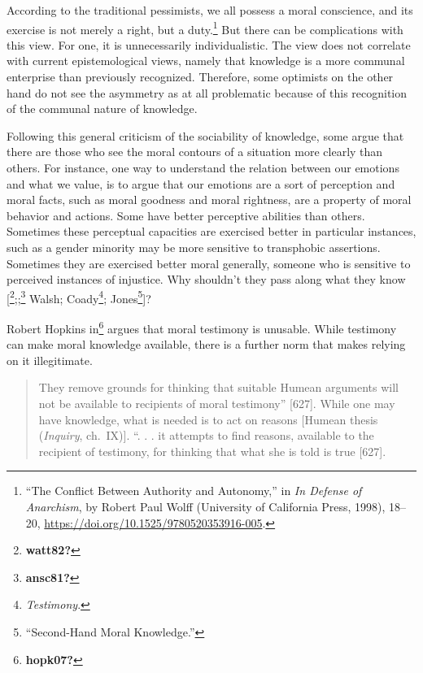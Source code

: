 \documentclass[
  12pt,
]{book}
\theoremstyle{definition}
\theoremstyle{definition}
\theoremstyle{definition}
\theoremstyle{definition}
\theoremstyle{remark}
\begin{document}
According to the traditional pessimists, we all possess a moral conscience, and its exercise is not merely a right, but a duty.\footnote{{``The {Conflict Between Authority} and {Autonomy},''} in \emph{In {Defense} of {Anarchism}}, by Robert Paul Wolff (University of California Press, 1998), 18--20, \url{https://doi.org/10.1525/9780520353916-005}.} But there can be complications with this view. For one, it is unnecessarily individualistic. The view does not correlate with current epistemological views, namely that knowledge is a more communal enterprise than previously recognized. Therefore, some optimists on the other hand do not see the asymmetry as at all problematic because of this recognition of the communal nature of knowledge.

Following this general criticism of the sociability of knowledge, some argue that there are those who see the moral contours of a situation more clearly than others. For instance, one way to understand the relation between our emotions and what we value, is to argue that our emotions are a sort of perception and moral facts, such as moral goodness and moral rightness, are a property of moral behavior and actions. Some have better perceptive abilities than others. Sometimes these perceptual capacities are exercised better in particular instances, such as a gender minority may be more sensitive to transphobic assertions. Sometimes they are exercised better moral generally, someone who is sensitive to perceived instances of injustice. Why shouldn't they pass along what they know {[}\footnote{\textbf{watt82?}};;\footnote{\textbf{ansc81?}} Walsh; Coady\footnote{\emph{Testimony}.}; Jones\footnote{{``Second-{Hand Moral Knowledge}.''}}{]}?

Robert Hopkins in\footnote{\textbf{hopk07?}} argues that moral testimony is unusable. While testimony can make moral knowledge available, there is a further norm that makes relying on it illegitimate.

\begin{quote}
They remove grounds for thinking that suitable Humean arguments will not be available to recipients of moral testimony'' {[}627{]}. While one may have knowledge, what is needed is to act on reasons {[}Humean thesis (\emph{Inquiry}, ch.~IX){]}. ``. . . it attempts to find reasons, available to the recipient of testimony, for thinking that what she is told is true {[}627{]}.
\end{quote}
\end{document}
